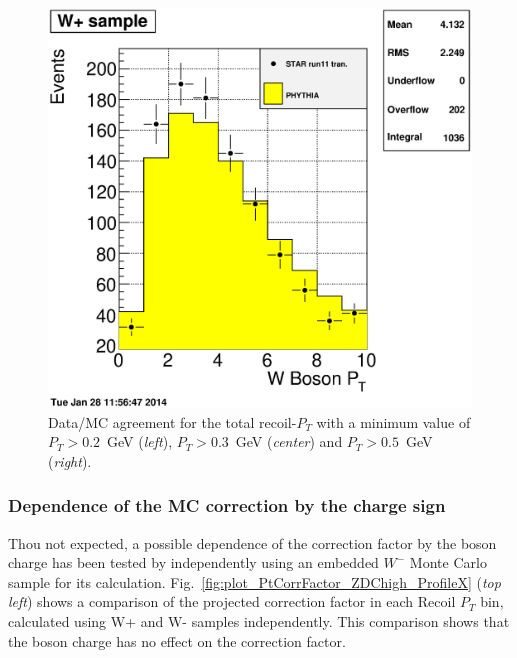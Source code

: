\documentclass[12pt]{article}
\begin{document}
\begin{figure}[htbp]
\begin{center}
\includegraphics[scale=0.28]{images/Pt-Recoil-study/plot_DataMc_WpPt_PtRecoil05}
\end{center}
\caption{Data/MC agreement for the total recoil-$P_{T}$ with a minimum value of $P_{T}>0.2$~GeV ({\it left}), $P_{T}>0.3$~GeV ({\it center}) and $P_{T}>0.5$~GeV ({\it right}).}
\label{fig:plot_DataMc_WpPt_PtRecoil}
\end{figure}

\subsubsection{Dependence of the MC correction by the charge sign}
Thou not expected, a possible dependence of the correction factor by the boson charge has been tested by independently using an embedded $W^{-}$ Monte Carlo sample for its calculation. Fig.~\ref{fig:plot_PtCorrFactor_ZDChigh_ProfileX} ({\it top left}) shows a comparison of the projected correction factor in each Recoil $P_{T}$ bin, calculated using  W+ and W- samples independently. This comparison shows that the boson charge has no effect on the correction factor.
\end{document}
